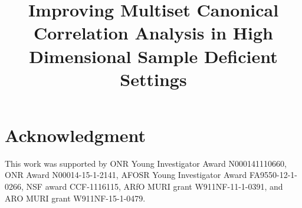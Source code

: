 \documentclass[conference]{IEEEtran}
\begin{document}
%
\title{Improving Multiset Canonical Correlation Analysis in High Dimensional Sample
  Deficient Settings}


\author{
\and
{}
}


\maketitle
%
\IEEEpeerreviewmaketitle

%



\section*{Acknowledgment}

This work was supported by ONR Young Investigator Award N000141110660, ONR Award
N00014-15-1-2141, AFOSR Young Investigator Award FA9550-12-1-0266, NSF award
CCF-1116115, ARfO MURI grant W911NF-11-1-0391, and ARO MURI grant W911NF-15-1-0479. 



\end{document}
